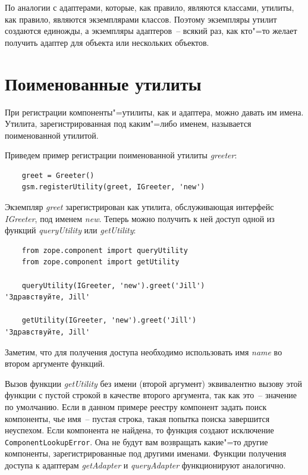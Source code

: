 \documentclass[a4paper,openany,twoside,final]{book}
\providecommand*{\DUroletitlereference}[1]{\textsl{#1}}
\begin{document}
По аналогии с адаптерами, которые, как правило, являются классами, утилиты, как правило, являются экземплярами классов.  Поэтому экземпляры утилит создаются единожды, а экземпляры адаптеров~-- всякий раз, как кто"=то желает получить адаптер для объекта или нескольких объектов.


\section{Поименованные утилиты%
  \label{id42}%
}

При регистрации компоненты"=утилиты, как и адаптера, можно давать им имена.  Утилита, зарегистрированная под каким"=либо именем, называется поименованной утилитой.

Приведем пример регистрации поименованной утилиты \DUroletitlereference{greeter}:

\begin{verbatim}
    greet = Greeter()
    gsm.registerUtility(greet, IGreeter, 'new')
\end{verbatim}

Экземпляр \DUroletitlereference{greet} зарегистрирован как утилита, обслуживающая интерфейс \DUroletitlereference{IGreeter}, под именем \DUroletitlereference{new}.  Теперь можно получить к ней доступ одной из функций \DUroletitlereference{queryUtility} или \DUroletitlereference{getUtility}:

\begin{verbatim}
    from zope.component import queryUtility
    from zope.component import getUtility

    queryUtility(IGreeter, 'new').greet('Jill')
'Здравствуйте, Jill'

    getUtility(IGreeter, 'new').greet('Jill')
'Здравствуйте, Jill'
\end{verbatim}

Заметим, что для получения доступа необходимо использовать имя \DUroletitlereference{name} во втором аргументе функций.

Вызов функции \DUroletitlereference{getUtility} без имени (второй аргумент) эквивалентно вызову этой функции с пустой строкой в качестве второго аргумента, так как это~-- значение по умолчанию.  Если в данном примере реестру компонент задать поиск компоненты, чье имя~-- пустая строка, такая попытка поиска завершится неуспехом.  Если компонента не найдена, то функция создают исключение \texttt{ComponentLookupError}.  Она не будут вам возвращать какие"=то другие компоненты, зарегистрированные под другими именами.  Функции получения доступа к адаптерам \DUroletitlereference{getAdapter} и \DUroletitlereference{queryAdapter} функционируют аналогично.
\end{document}
